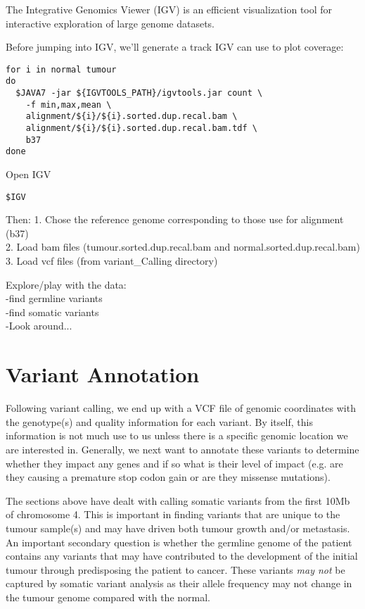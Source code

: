 The Integrative Genomics Viewer (IGV) is an efficient visualization tool for interactive exploration of large genome datasets. 

Before jumping into IGV, we'll generate a track IGV can use to plot coverage:


\begin{lstlisting}
for i in normal tumour
do
  $JAVA7 -jar ${IGVTOOLS_PATH}/igvtools.jar count \
    -f min,max,mean \
    alignment/${i}/${i}.sorted.dup.recal.bam \
    alignment/${i}/${i}.sorted.dup.recal.bam.tdf \
    b37
done
\end{lstlisting}

Open IGV
\begin{lstlisting}
$IGV
\end{lstlisting}

Then:
   1. Chose the reference genome corresponding to those use for alignment (b37) \\
   2. Load bam files (tumour.sorted.dup.recal.bam and normal.sorted.dup.recal.bam) \\
   3. Load vcf files (from variant_Calling directory)

Explore/play with the data: \\ 
   -find germline variants \\
   -find somatic variants \\
   -Look around...

\newpage



\section{Variant Annotation}

Following variant calling, we end up with a VCF file of genomic coordinates with the genotype(s) and quality information for each variant. By itself, this information is not much use to us unless there is a specific genomic location we are interested in. Generally, we next want to annotate these variants to determine whether they impact any genes and if so what is their level of impact (e.g. are they causing a premature stop codon gain or are they missense mutations).

The sections above have dealt with calling somatic variants from the first 10Mb of chromosome 4. This is important in finding variants that are unique to the tumour sample(s) and may have driven both tumour growth and/or metastasis. An important secondary question is whether the germline genome of the patient contains any variants that may have contributed to the development of the initial tumour through predisposing the patient to cancer. These variants \textit{may not} be captured by somatic variant analysis as their allele frequency may not change in the tumour genome compared with the normal.

